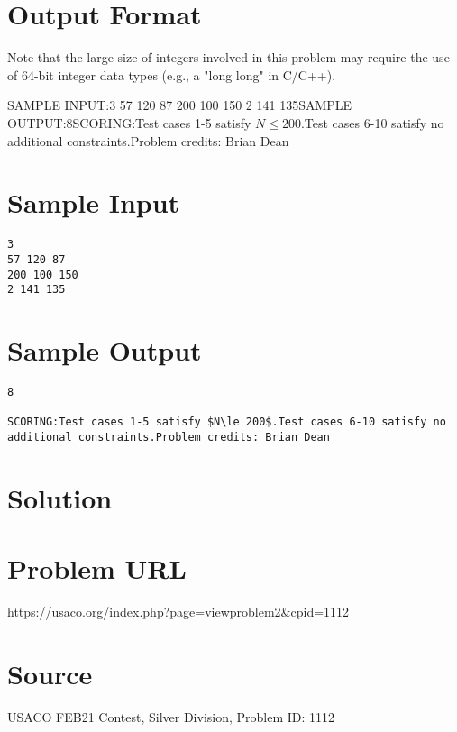\documentclass[12pt]{article}
\begin{document}
\section*{Output Format}
Note that the large size of integers involved in this problem may require the
use of 64-bit integer data types (e.g., a "long long" in C/C++).

SAMPLE INPUT:3
57 120 87
200 100 150
2 141 135SAMPLE OUTPUT:8SCORING:Test cases 1-5 satisfy $N\le 200$.Test cases 6-10 satisfy no
additional constraints.Problem credits: Brian Dean

\section*{Sample Input}
\begin{verbatim}
3
57 120 87
200 100 150
2 141 135
\end{verbatim}

\section*{Sample Output}
\begin{verbatim}
8

SCORING:Test cases 1-5 satisfy $N\le 200$.Test cases 6-10 satisfy no
additional constraints.Problem credits: Brian Dean
\end{verbatim}

\section*{Solution}


\section*{Problem URL}
https://usaco.org/index.php?page=viewproblem2&cpid=1112

\section*{Source}
USACO FEB21 Contest, Silver Division, Problem ID: 1112
\end{document}

